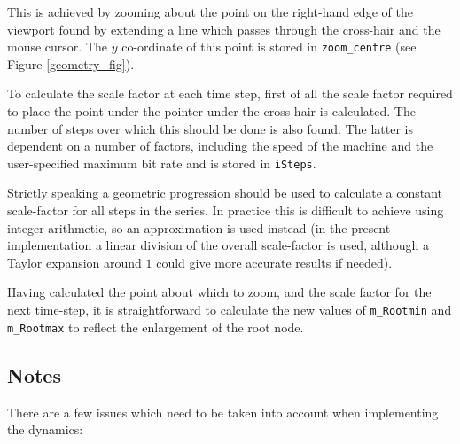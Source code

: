 \documentclass{article}
\begin{document}
This is achieved by zooming about the point on the right-hand edge of the viewport found by extending a line which passes through the cross-hair and the mouse cursor. The $y$ co-ordinate of this point is stored in {\tt zoom\_centre} (see Figure \ref{geometry_fig}).

To calculate the scale factor at each time step, first of all the scale factor required to place the point under the pointer under the cross-hair is calculated. The number of steps over which this should be done is also found. The latter is dependent on a number of factors, including the speed of the machine and the user-specified maximum bit rate and is stored in {\tt iSteps}.

Strictly speaking a geometric progression should be used to calculate a constant scale-factor for all steps in the series. In practice this is difficult to achieve using integer arithmetic, so an approximation is used instead (in the present implementation a linear division of the overall scale-factor is used, although a Taylor expansion around $1$ could give more accurate results if needed).

Having calculated the point about which to zoom, and the scale factor for the next time-step, it is straightforward to calculate the new values of {\tt m\_Rootmin} and {\tt m\_Rootmax} to reflect the enlargement of the root node.

\subsection{Notes}

There are a few issues which need to be taken into account when implementing the dynamics:
\end{document}
